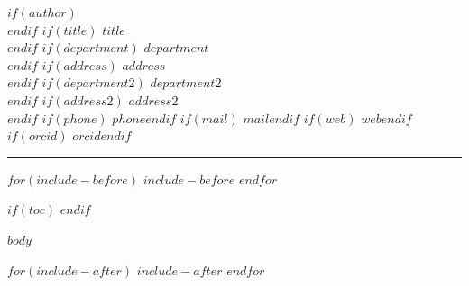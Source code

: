 \documentclass[10pt]{scrartcl}
\begin{document}
\begin{center}
  $if(author)$\textbf{\LARGE\color{titlegrey}}\\$endif$
  $if(title)$ $title$\\$endif$
  $if(department)$ $department$\\$endif$
  $if(address)$ $address$\\$endif$
  $if(department2)$ $department2$\\$endif$
  $if(address2)$ $address2$\\$endif$
  $if(phone)$\faPhone{} $phone$$endif$
  $if(mail)$ \href{mailto:$mail$}{$mail$}$endif$
  $if(web)$ \href{https://$web$}{$web$}$endif$
  $if(orcid)$\aiOrcid{} \href{https://orcid.org/$orcid$}{$orcid$}$endif$
  \par\noindent\rule{\textwidth}{0.4pt}
\end{center}

$for(include-before)$
$include-before$
$endfor$

$if(toc)$
\tableofcontents
$endif$

$body$

$for(include-after)$
$include-after$
$endfor$
\end{document}
